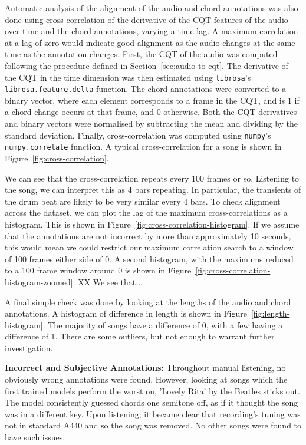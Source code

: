 Automatic analysis of the alignment of the audio and chord annotations was also done using cross-correlation of the derivative of the CQT features of the audio over time and the chord annotations, varying a time lag. A maximum correlation at a lag of zero would indicate good alignment as the audio changes at the same time as the annotation changes. First, the CQT of the audio was computed following the procedure defined in Section~\ref{sec:audio-to-cqt}. The derivative of the CQT in the time dimension was then estimated using \texttt{librosa}'s \texttt{librosa.feature.delta} function. The chord annotations were converted to a binary vector, where each element corresponds to a frame in the CQT, and is 1 if a chord change occurs at that frame, and 0 otherwise. Both the CQT derivatives and binary vectors were normalised by subtracting the mean and dividing by the standard deviation. Finally, cross-correlation was computed using \texttt{numpy}'s \texttt{numpy.correlate} function. A typical cross-correlation for a song is shown in Figure~\ref{fig:cross-correlation}.

We can see that the cross-correlation repeats every 100 frames or so. Listening to the song, we can interpret this as 4 bars repeating. In particular, the transients of the drum beat are likely to be very similar every 4 bars. To check alignment across the dataset, we can plot the lag of the maximum cross-correlations as a histogram. This is shown in Figure~\ref{fig:cross-correlation-histogram}. If we assume that the annotations are not incorrect by more than approximately 10 seconds, this would mean we could restrict our maximum correlation search to a window of 100 frames either side of 0. A second histogram, with the maximums reduced to a 100 frame window around 0 is shown in Figure~\ref{fig:cross-correlation-histogram-zoomed}. XX We see that...

A final simple check was done by looking at the lengths of the audio and chord annotations. A histogram of difference in length is shown in Figure~\ref{fig:length-histogram}. The majority of songs have a difference of 0, with a few having a difference of 1. There are some outliers, but not enough to warrant further investigation.

\textbf{Incorrect and Subjective Annotations:} Throughout manual listening, no obviously wrong annotations were found. However, looking at songs which the first trained models perform the worst on, 'Lovely Rita' by the Beatles sticks out. The model consistently guessed chords one semitone off, as if it thought the song was in a different key. Upon listening, it became clear that recording's tuning was not in standard A440 and so the song was removed. No other songs were found to have such issues.

